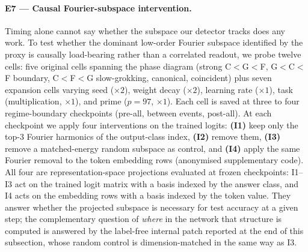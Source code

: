 \documentclass{article}
\begin{document}
\paragraph{E7 --- Causal Fourier-subspace intervention.}
Timing alone cannot say whether the subspace our detector tracks
does any work.
To test whether the dominant low-order Fourier subspace
identified by the proxy is causally load-bearing rather than a
correlated readout, we probe twelve cells: five original cells
spanning the phase diagram (strong C$<$G$<$F, G$<$C$<$F boundary,
C$<$F$<$G slow-grokking, canonical, coincident) plus seven
expansion cells varying seed ($\times 2$), weight decay
($\times 2$), learning rate ($\times 1$), task (multiplication,
$\times 1$), and prime ($p{=}97$, $\times 1$).
Each cell is saved at three to four regime-boundary checkpoints
(pre-all, between events, post-all).
At each checkpoint we apply four interventions on the trained
logits: \textbf{(I1)} keep only the top-$3$ Fourier harmonics of
the output-class index, \textbf{(I2)} remove them, \textbf{(I3)}
remove a matched-energy random subspace as control, and
\textbf{(I4)} apply the same Fourier removal to the token
embedding rows (anonymised supplementary code).
All four are representation-space projections evaluated at frozen
checkpoints: I1--I3 act on the trained logit matrix with a basis
indexed by the answer class, and I4 acts on the embedding rows
with a basis indexed by the token value.
They answer whether the projected subspace is necessary for test
accuracy at a given step; the complementary question of
\emph{where} in the network that structure is computed is
answered by the label-free internal patch reported at the end of
this subsection, whose random control is dimension-matched in the
same way as I3.
\end{document}
